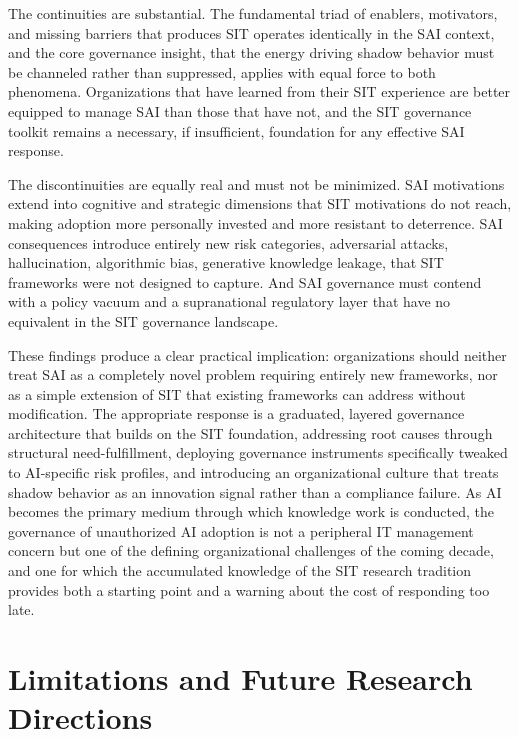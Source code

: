 \documentclass[12pt,oneside]{article}
\begin{document}
The continuities are substantial. The fundamental triad of enablers, motivators, and missing barriers that produces \ac{SIT} operates identically in the \ac{SAI} context, and the core governance insight, that the energy driving shadow behavior must be channeled rather than suppressed, applies with equal force to both phenomena. Organizations that have learned from their \ac{SIT} experience are better equipped to manage \ac{SAI} than those that have not, and the \ac{SIT} governance toolkit remains a necessary, if insufficient, foundation for any effective \ac{SAI} response.

The discontinuities are equally real and must not be minimized. \ac{SAI} motivations extend into cognitive and strategic dimensions that \ac{SIT} motivations do not reach, making adoption more personally invested and more resistant to deterrence. \ac{SAI} consequences introduce entirely new risk categories, adversarial attacks, hallucination, algorithmic bias, generative knowledge leakage, that \ac{SIT} frameworks were not designed to capture. And \ac{SAI} governance must contend with a policy vacuum and a supranational regulatory layer that have no equivalent in the \ac{SIT} governance landscape.

These findings produce a clear practical implication: organizations should neither treat \ac{SAI} as a completely novel problem requiring entirely new frameworks, nor as a simple extension of \ac{SIT} that existing frameworks can address without modification. The appropriate response is a graduated, layered governance architecture that builds on the \ac{SIT} foundation, addressing root causes through structural need-fulfillment, deploying governance instruments specifically tweaked to \ac{AI}-specific risk profiles, and introducing an organizational culture that treats shadow behavior as an innovation signal rather than a compliance failure. As \ac{AI} becomes the primary medium through which knowledge work is conducted, the governance of unauthorized \ac{AI} adoption is not a peripheral \ac{IT} management concern but one of the defining organizational challenges of the coming decade, and one for which the accumulated knowledge of the \ac{SIT} research tradition provides both a starting point and a warning about the cost of responding too late.

\section{Limitations and Future Research Directions} \label{limitations}
\end{document}
